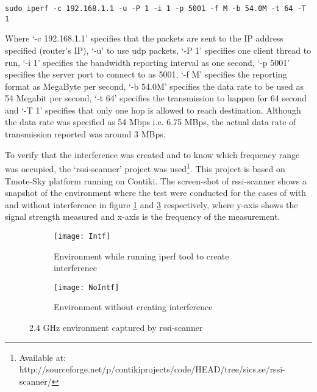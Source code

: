 \texttt{sudo iperf -c 192.168.1.1 -u -P 1 -i 1 -p 5001 -f M -b 54.0M -t 64 -T 1}

Where `-c 192.168.1.1' specifies that the packets are sent to the IP address specified (router's IP), `-u' to use \gls{udp} packets, `-P 1' specifies one client thread to run, `-i 1' specifies the bandwidth reporting interval as one second, `-p 5001' specifies the server port to connect to as 5001, `-f M' specifies the reporting format as MegaByte per second, `-b 54.0M' specifies the data rate to be used as 54 Megabit per second, `-t 64' specifies the transmission to happen for 64 second and `-T 1' specifies that only one hop is allowed to reach destination. Although the data rate was specified as 54 Mbps i.e. 6.75 MBps, the actual data rate of transmission reported was around 3 MBps. 

To verify that the interference was created and to know which frequency range was occupied, the `rssi-scanner' project was used\footnote{Available at: http://sourceforge.net/p/contikiprojects/code/HEAD/tree/sics.se/rssi-scanner/}. This project is based on Tmote-Sky platform running on Contiki. The screen-shot of rssi-scanner shows a snapshot of the environment where the test were conducted for the cases of with and without interference in figure \ref{fig:Intf} and \ref{fig:NoIntf} respectively, where y-axis shows the signal strength measured and x-axis is the frequency of the measurement.

\begin{figure}[h]
	\begin{subfigure}[b]{1\textwidth}
		\texttt{[image: Intf]}
		\caption{Environment while running iperf tool to create interference}
		\vspace{10pt}
		\label{fig:Intf}
	\end{subfigure}

	\begin{subfigure}[b]{1\textwidth}
		\texttt{[image: NoIntf]}
		\caption{Environment without creating interference}
		\label{fig:NoIntf}
	\end{subfigure}
	\caption{2.4 GHz environment captured by rssi-scanner}
	\vspace{-10pt}
\end{figure}


